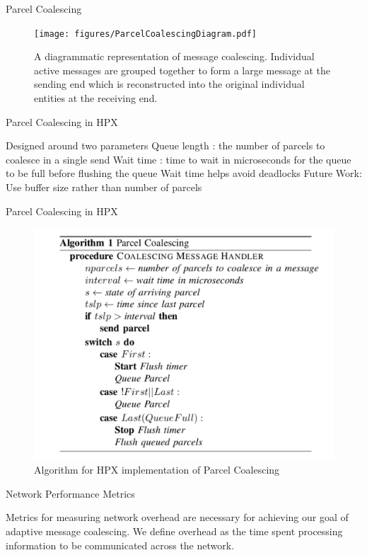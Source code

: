 \documentclass[10pt]{beamer}
\begin{document}
\begin{frame}{Parcel Coalescing}
\begin{figure}
	\centering
	\texttt{[image: figures/ParcelCoalescingDiagram.pdf]}
	\caption{{A diagrammatic representation of message coalescing. Individual active messages are grouped together to form a large message at the sending end which is reconstructed into the original individual entities at the receiving end.}}
	\label{figureCOAL}
\end{figure}
\end{frame}

\begin{frame}{Parcel Coalescing in HPX}
\begin{outline}
	\1 Designed around two parameters
		\2 Queue length : the number of parcels to coalesce in a single send
		\2 Wait time : time to wait in microseconds for the queue to be full before flushing the queue
	\1 Wait time helps avoid deadlocks 
	\1 Future Work: Use buffer size rather than number of parcels
\end{outline}
\end{frame}

\begin{frame}{Parcel Coalescing in HPX}
\begin{figure}
	\centering
	\includegraphics[width=0.8\linewidth]{figures/coalescing_algo.pdf}
	\caption{{Algorithm for HPX implementation of Parcel Coalescing}}
\end{figure}
\end{frame}

\begin{frame}{Network Performance Metrics}
\begin{outline}
	\1 Metrics for measuring network overhead are necessary for achieving our goal of adaptive message coalescing.
	\1 We define overhead as the time spent processing information to be communicated across the network.
\end{outline}
\end{frame}
\end{document}
